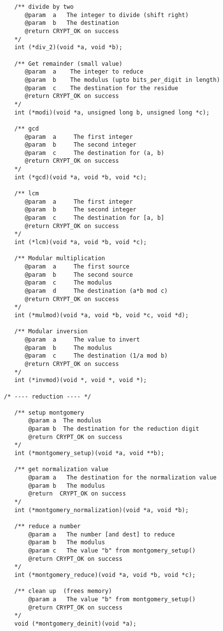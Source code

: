\documentclass[a4paper]{book}
\begin{document}
\begin{small}
\begin{verbatim}
   /** divide by two 
      @param  a   The integer to divide (shift right)
      @param  b   The destination 
      @return CRYPT_OK on success
   */
   int (*div_2)(void *a, void *b);

   /** Get remainder (small value)
      @param  a    The integer to reduce
      @param  b    The modulus (upto bits_per_digit in length)
      @param  c    The destination for the residue
      @return CRYPT_OK on success
   */
   int (*modi)(void *a, unsigned long b, unsigned long *c);

   /** gcd 
      @param  a     The first integer
      @param  b     The second integer
      @param  c     The destination for (a, b)
      @return CRYPT_OK on success
   */
   int (*gcd)(void *a, void *b, void *c);

   /** lcm 
      @param  a     The first integer
      @param  b     The second integer
      @param  c     The destination for [a, b]
      @return CRYPT_OK on success
   */
   int (*lcm)(void *a, void *b, void *c);

   /** Modular multiplication
      @param  a     The first source
      @param  b     The second source 
      @param  c     The modulus
      @param  d     The destination (a*b mod c)
      @return CRYPT_OK on success
   */
   int (*mulmod)(void *a, void *b, void *c, void *d);

   /** Modular inversion
      @param  a     The value to invert
      @param  b     The modulus 
      @param  c     The destination (1/a mod b)
      @return CRYPT_OK on success
   */
   int (*invmod)(void *, void *, void *);

/* ---- reduction ---- */

   /** setup montgomery
       @param a  The modulus 
       @param b  The destination for the reduction digit 
       @return CRYPT_OK on success
   */
   int (*montgomery_setup)(void *a, void **b);

   /** get normalization value 
       @param a   The destination for the normalization value
       @param b   The modulus
       @return  CRYPT_OK on success
   */
   int (*montgomery_normalization)(void *a, void *b);

   /** reduce a number
       @param a   The number [and dest] to reduce
       @param b   The modulus
       @param c   The value "b" from montgomery_setup()
       @return CRYPT_OK on success
   */
   int (*montgomery_reduce)(void *a, void *b, void *c);

   /** clean up  (frees memory)
       @param a   The value "b" from montgomery_setup()
       @return CRYPT_OK on success
   */      
   void (*montgomery_deinit)(void *a);


\end{verbatim}
\end{small}
\end{document}
